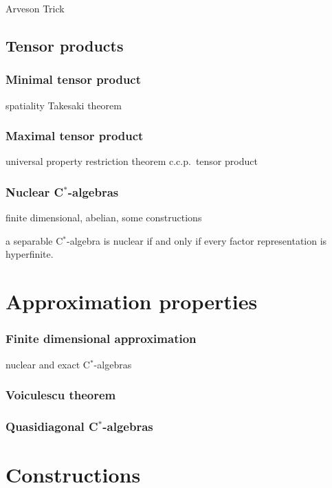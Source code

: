 \documentclass{../../large}
\begin{document}
Arveson
Trick




\chapter{Tensor products}

\section{Minimal tensor product}
spatiality
Takesaki theorem

\section{Maximal tensor product}

universal property
restriction theorem
c.c.p.~tensor product

\section{Nuclear C$^*$-algebras}
finite dimensional, abelian, some constructions




a separable C$^*$-algebra is nuclear if and only if every factor representation is hyperfinite.





\part{Approximation properties}

\section{Finite dimensional approximation}
nuclear and exact C$^*$-algebras
\section{Voiculescu theorem}
\section{Quasidiagonal C$^*$-algebras}


\part{Constructions}
\end{document}
